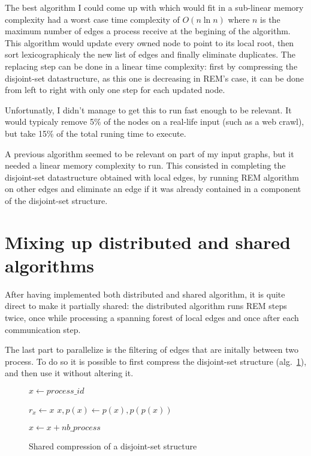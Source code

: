 \documentclass[12px]{article}
\begin{document}
        The best algorithm I could come up with which would fit in a sub-linear memory complexity had a worst case time complexity of $O(n \ln n)$ where $n$ is the maximum number of edges a process receive at the begining of the algorithm.
        This algorithm would update every owned node to point to its local root, then sort lexicographicaly the new list of edges and finally eliminate duplicates.
        The replacing step can be done in a linear time complexity: first by compressing the disjoint-set datastructure, as this one is decreasing in REM's case, it can be done from left to right with only one step for each updated node.

        Unfortunatly, I didn't manage to get this to run fast enough to be relevant.
        It would typicaly remove 5\% of the nodes on a real-life input (such as a web crawl), but take 15\% of the total runing time to execute.

        A previous algorithm seemed to be relevant on part of my input graphs, but it needed a linear memory complexity to run.
        This consisted in completing the disjoint-set datastructure obtained with local edges, by running REM algorithm on other edges and eliminate an edge if it was already contained in a component of the disjoint-set structure.

  \section{Mixing up distributed and shared algorithms}
    After having implemented both distributed and shared algorithm, it is quite direct to make it partially shared: the distributed algorithm runs REM steps twice, once while processing a spanning forest of local edges and once after each communication step.

    The last part to parallelize is the filtering of edges that are initally between two process. To do so it is possible to first compress the disjoint-set structure (alg.~\ref{alg:shared_compress}), and then use it without altering it.

    \begin{figure}
      \centering
      \begin{minipage}{8cm}
        \begin{algorithm}[H]
          \caption{Shared compression of a disjoint-set structure}%
          \label{alg:shared_compress}
          \begin{algorithmic}[1]
              \State $x \gets process\_id$

                \State $r_x \gets x$
                  \State $x, p(x) \gets p(x), p(p(x))$
                \EndWhile

                \State $x \gets x + nb\_process$
              \EndWhile
            \EndFunction
         \end{algorithmic}
        \end{algorithm}
      \end{minipage}
    \end{figure}
\end{document}
